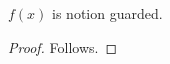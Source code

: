 

\begin{proposition}\label{notion_presentation_application}
    $f(x)$ is notion guarded.
\end{proposition}
\begin{proof}
    Follows.
\end{proof}
